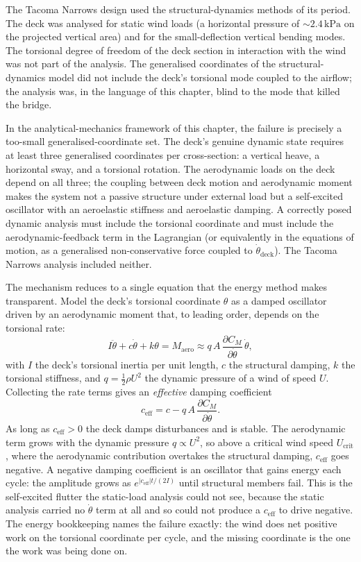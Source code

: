 The Tacoma Narrows design used the structural-dynamics methods of
its period. The deck was analysed for static wind loads (a horizontal
pressure of $\sim 2.4\,\text{kPa}$ on the projected vertical area)
and for the small-deflection vertical bending modes. The torsional
degree of freedom of the deck section in interaction with the wind
was not part of the analysis. The generalised coordinates of the
structural-dynamics model did not include the deck's torsional mode
coupled to the airflow; the analysis was, in the language of this
chapter, blind to the mode that killed the bridge.

In the analytical-mechanics framework of this chapter, the failure
is precisely a too-small generalised-coordinate set. The deck's
genuine dynamic state requires at least three generalised coordinates
per cross-section: a vertical heave, a horizontal sway, and a
torsional rotation. The aerodynamic loads on the deck depend on all
three; the coupling between deck motion and aerodynamic moment makes
the system not a passive structure under external load but a
self-excited oscillator with an aeroelastic stiffness and aeroelastic
damping. A correctly posed dynamic analysis must include the
torsional coordinate and must include the aerodynamic-feedback term
in the Lagrangian (or equivalently in the equations of motion, as a
generalised non-conservative force coupled to $\dot{\theta}_{
\text{deck}}$). The Tacoma Narrows analysis included neither.

The mechanism reduces to a single equation that the energy method makes
transparent. Model the deck's torsional coordinate $\theta$ as a damped
oscillator driven by an aerodynamic moment that, to leading order,
depends on the torsional rate:
\[
I\ddot{\theta} + c\dot{\theta} + k\theta = M_\text{aero}
\approx q\,A\,\frac{\partial C_M}{\partial\dot\theta}\,\dot\theta,
\]
with $I$ the deck's torsional inertia per unit length, $c$ the
structural damping, $k$ the torsional stiffness, and $q = \tfrac12\rho
U^2$ the dynamic pressure of a wind of speed $U$. Collecting the
rate terms gives an \emph{effective} damping coefficient
\[
c_\text{eff} = c - q\,A\,\frac{\partial C_M}{\partial\dot\theta}.
\]
As long as $c_\text{eff} > 0$ the deck damps disturbances and is stable.
The aerodynamic term grows with the dynamic pressure $q\propto U^2$, so
above a critical wind speed $U_\text{crit}$, where the aerodynamic
contribution overtakes the structural damping, $c_\text{eff}$ goes
negative. A negative damping coefficient is an oscillator that gains
energy each cycle: the amplitude grows as $e^{|c_\text{eff}|t/(2I)}$
until structural members fail. This is the self-excited flutter the
static-load analysis could not see, because the static analysis carried
no $\dot\theta$ term at all and so could not produce a $c_\text{eff}$ to
drive negative. The energy bookkeeping names the failure exactly: the
wind does net positive work on the torsional coordinate per cycle, and
the missing coordinate is the one the work was being done on.

